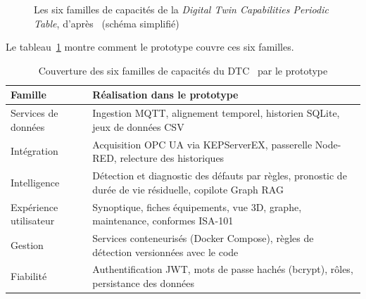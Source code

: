 \begin{figure}[H]
\centering
{}
\caption{Les six familles de capacités de la \textit{Digital Twin Capabilities Periodic Table}, d'après~\cite{dtccpt} (schéma simplifié)}
\label{fig:cpt}
\end{figure}

Le tableau~\ref{tab:dtc} montre comment le prototype couvre ces six familles.

\begin{table}[H]
\centering
\caption{Couverture des six familles de capacités du DTC~\cite{dtccpt} par le prototype}
\label{tab:dtc}
\begin{tabularx}{\textwidth}{lX}
\toprule
\textbf{Famille} & \textbf{Réalisation dans le prototype} \\
\midrule
Services de données & Ingestion MQTT, alignement temporel, historien SQLite, jeux de données CSV \\
Intégration & Acquisition OPC UA via KEPServerEX, passerelle Node-RED, relecture des historiques \\
Intelligence & Détection et diagnostic des défauts par règles, pronostic de durée de vie résiduelle, copilote Graph RAG \\
Expérience utilisateur & Synoptique, fiches équipements, vue 3D, graphe, maintenance, conformes ISA-101 \\
Gestion & Services conteneurisés (Docker Compose), règles de détection versionnées avec le code \\
Fiabilité & Authentification JWT, mots de passe hachés (bcrypt), rôles, persistance des données \\
\bottomrule
\end{tabularx}
\end{table}

